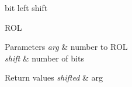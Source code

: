 bit left shift 



 R\-O\-L


\begin{DoxyParams}{Parameters}
{\em arg} & number to R\-O\-L \\
\hline
{\em shift} & number of bits\\
\hline
\end{DoxyParams}

\begin{DoxyRetVals}{Return values}
{\em shifted} & arg \\
\hline
\end{DoxyRetVals}
